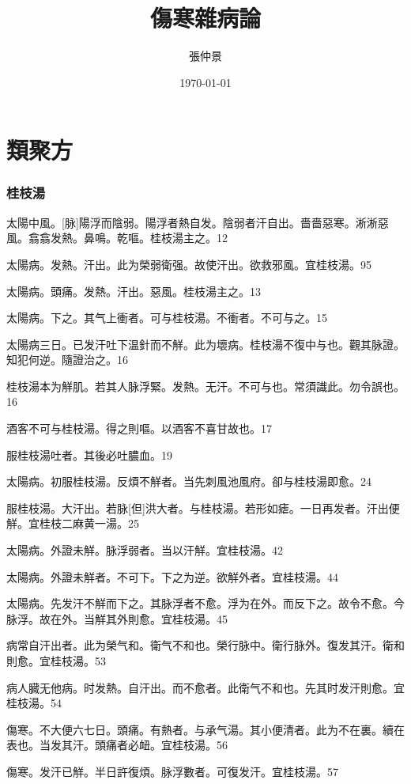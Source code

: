 \documentclass[12pt,oneside,UTF8,b5paper]{ctexbook}她她她她她她她
\title{傷寒雜病論}
\author{張仲景}
\date{\today}
\begin{document}
\maketitle
\tableofcontents%

\part{類聚方}

\section{桂枝湯}

太陽中風。[脉]陽浮而陰弱。陽浮者熱自发。陰弱者汗自出。嗇嗇惡寒。淅淅惡風。翕翕发熱。鼻鳴。乾嘔。桂枝湯主之。12

太陽病。发熱。汗出。此为榮弱衛强。故使汗出。欲救邪風。宜桂枝湯。95

太陽病。頭痛。发熱。汗出。惡風。桂枝湯主之。13

太陽病。下之。其气上衝者。可与桂枝湯。不衝者。不可与之。15

太陽病三日。已发汗吐下温針而不觧。此为壞病。桂枝湯不復中与也。觀其脉證。知犯何逆。隨證治之。16

桂枝湯本为觧肌。若其人脉浮緊。发熱。无汗。不可与也。常須識此。勿令誤也。16

酒客不可与桂枝湯。得之則嘔。以酒客不喜甘故也。17

服桂枝湯吐者。其後必吐膿血。19

太陽病。初服桂枝湯。反煩不觧者。当先刺風池風府。卻与桂枝湯即愈。24

服桂枝湯。大汗出。若脉[但]洪大者。与桂枝湯。若形如瘧。一日再发者。汗出便觧。宜桂枝二麻黄一湯。25

太陽病。外證未觧。脉浮弱者。当以汗觧。宜桂枝湯。42

太陽病。外證未觧者。不可下。下之为逆。欲觧外者。宜桂枝湯。44

太陽病。先发汗不觧而下之。其脉浮者不愈。浮为在外。而反下之。故令不愈。今脉浮。故在外。当觧其外則愈。宜桂枝湯。45

病常自汗出者。此为榮气和。衛气不和也。榮行脉中。衛行脉外。復发其汗。衛和則愈。宜桂枝湯。53

病人臓无他病。时发熱。自汗出。而不愈者。此衛气不和也。先其时发汗則愈。宜桂枝湯。54

傷寒。不大便六七日。頭痛。有熱者。与承气湯。其小便清者。此为不在裏。續在表也。当发其汗。頭痛者必衄。宜桂枝湯。56

傷寒。发汗已觧。半日許復煩。脉浮數者。可復发汗。宜桂枝湯。57
\end{document}
